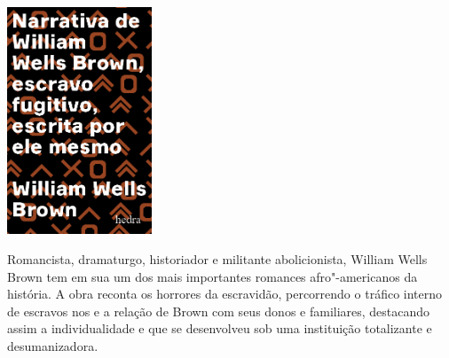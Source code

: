 \pagebreak

\hspace{.5cm}

\begin{center}
\hspace*{-4.5cm}
\hspace*{4cm}\includegraphics[width=43mm]{./imgs/wwb.jpg}
\end{center}

\hspace*{-7cm}\hrulefill\hspace*{-7cm}

\medskip

\noindent{}Romancista, dramaturgo, historiador e militante abolicionista, William Wells Brown tem em sua {} um dos mais importantes romances afro"-americanos da história. A obra reconta os horrores da escravidão, percorrendo o tráfico interno de escravos nos  e a relação de Brown com seus donos e familiares, destacando assim a individualidade e que se desenvolveu sob uma instituição totalizante e desumanizadora.

\vfill

\hspace*{-.4cm}\begin{minipage}[c]{1\linewidth}
\small{
{}}
\end{minipage}


